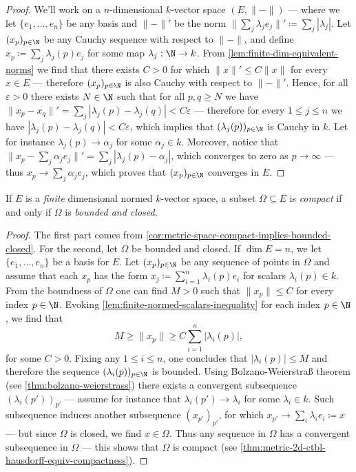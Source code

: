 \begin{proof}
We'll work on a \(n\)-dimensional \(k\)-vector space \((E, \| - \|)\) --- where
we let \(\{e_1, \dots, e_n\}\) be any basis and \(\| - \|'\) be the norm \(\|
\sum_j \lambda_j e_j \|' \coloneq \sum_j |\lambda_j|\). Let \((x_p)_{p \in \N}\)
be any Cauchy sequence with respect to \(\| - \|\), and define \(x_p \coloneq
\sum_j \lambda_j(p) e_j\) for some map \(\lambda_j: \N \to k\). From
\cref{lem:finite-dim-equivalent-norms} we find that there exists \(C > 0\) for
which \(\| x \|' \leq C \| x \|\) for every \(x \in E\) --- therefore \((x_p)_{p
\in \N}\) is also Cauchy with respect to \(\| - \|'\). Hence, for all
\(\varepsilon > 0\) there exists \(N \in \N\) such that for all \(p, q \geq N\)
we have \(\| x_p - x_q \|' = \sum_j |\lambda_j(p) - \lambda_j(q)| <
C \varepsilon\) --- therefore for every \(1 \leq j \leq n\) we have
\(|\lambda_j(p) - \lambda_j(q)| < C \varepsilon\), which implies that
\((\lambda_j(p))_{p \in \N}\) is Cauchy in \(k\). Let for instance
\(\lambda_j(p) \to \alpha_j\) for some \(\alpha_j \in k\). Moreover, notice that
\(\| x_p - \sum_j \alpha_j e_j\|' = \sum_j |\lambda_j(p) - \alpha_j|\), which
converges to zero as \(p \to \infty\) --- thus \(x_p \to \sum_j \alpha_j e_j\),
which proves that \((x_p)_{p \in \N}\) converges in \(E\).
\end{proof}

\begin{proposition}
\label{prop:compact-on-normed-space}
If \(E\) is a \emph{finite} dimensional normed \(k\)-vector space, a subset
\(\Omega \subseteq E\) is \emph{compact} if and only if \(\Omega\) is
\emph{bounded and closed}.
\end{proposition}

\begin{proof}
The first part comes from
\cref{cor:metric-space-compact-implies-bounded-closed}. For the second, let
\(\Omega\) be bounded and closed. If \(\dim E = n\), we let \(\{e_1, \dots,
e_n\}\) be a basis for \(E\). Let \((x_p)_{p \in \N}\) be any sequence of points
in \(\Omega\) and assume that each \(x_p\) has the form \(x_j\coloneq
\sum_{i=1}^n \lambda_i(p) e_i\) for scalars \(\lambda_i(p) \in k\). From the
boundness of \(\Omega\) one can find \(M > 0\) such that \(\| x_p \| \leq C\)
for every index \(p \in \N\). Evoking
\cref{lem:finite-normed-scalars-inequality} for each index \(p \in \N\), we find
that
\[
M \geq \| x_p \| \geq C \sum_{i=1}^n |\lambda_i(p)|,
\]
for some \(C > 0\). Fixing any \(1 \leq i \leq n\), one concludes that
\(|\lambda_i(p)| \leq M\) and therefore the sequence \((\lambda_i(p))_{p \in
\N}\) is bounded. Using Bolzano-Weierstra{\ss} theorem (see
\cref{thm:bolzano-weierstrass}) there exists a convergent subsequence
\((\lambda_i(p'))_{p'}\) --- assume for instance that \(\lambda_i(p') \to
\lambda_i\) for some \(\lambda_i \in k\). Such subsequence induces another
subsequence \((x_{p'})_{p'}\), for which \(x_{p'} \to \sum_i \lambda_i e_i
\coloneq x\) --- but since \(\Omega\) is closed, we find \(x \in \Omega\). Thus
any sequence in \(\Omega\) has a convergent subsequence in \(\Omega\) --- this
shows that \(\Omega\) is compact (see
\cref{thm:metric-2d-ctbl-hausdorff-equiv-compactness}).
\end{proof}

